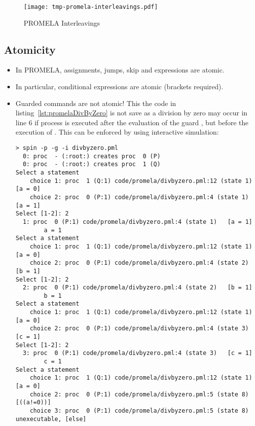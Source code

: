 				\begin{figure}
					\centering
					\texttt{[image: tmp-promela-interleavings.pdf]}
					\caption{PROMELA Interleavings}
					\label{fig:promelaInterleaving}
				\end{figure}

		\subsection{Atomicity}
			
			\begin{itemize}
				\item In PROMELA, assignments, jumps, skip and expressions are atomic.
				\item In particular, conditional expressions  are atomic (brackets required).
				\item Guarded commands are not atomic! This the code in listing~\ref{lst:promelaDivByZero} is not save as a division by zero may occur in line 6 if process  is executed after the evaluation of the guard , but before the execution of . This can be enforced by using interactive simulation:
					\begin{lstlisting}[numbers = none]
> spin -p -g -i divbyzero.pml
  0: proc  - (:root:) creates proc  0 (P)
  0: proc  - (:root:) creates proc  1 (Q)
Select a statement
	choice 1: proc  1 (Q:1) code/promela/divbyzero.pml:12 (state 1) [a = 0]
	choice 2: proc  0 (P:1) code/promela/divbyzero.pml:4 (state 1) [a = 1]
Select [1-2]: 2
  1: proc  0 (P:1) code/promela/divbyzero.pml:4 (state 1)	[a = 1]
		a = 1
Select a statement
	choice 1: proc  1 (Q:1) code/promela/divbyzero.pml:12 (state 1) [a = 0]
	choice 2: proc  0 (P:1) code/promela/divbyzero.pml:4 (state 2) [b = 1]
Select [1-2]: 2
  2: proc  0 (P:1) code/promela/divbyzero.pml:4 (state 2)	[b = 1]
		b = 1
Select a statement
	choice 1: proc  1 (Q:1) code/promela/divbyzero.pml:12 (state 1) [a = 0]
	choice 2: proc  0 (P:1) code/promela/divbyzero.pml:4 (state 3) [c = 1]
Select [1-2]: 2
  3: proc  0 (P:1) code/promela/divbyzero.pml:4 (state 3)	[c = 1]
		c = 1
Select a statement
	choice 1: proc  1 (Q:1) code/promela/divbyzero.pml:12 (state 1) [a = 0]
	choice 2: proc  0 (P:1) code/promela/divbyzero.pml:5 (state 8) [((a!=0))]
	choice 3: proc  0 (P:1) code/promela/divbyzero.pml:5 (state 8) unexecutable, [else]

\end{lstlisting}
\end{itemize}
